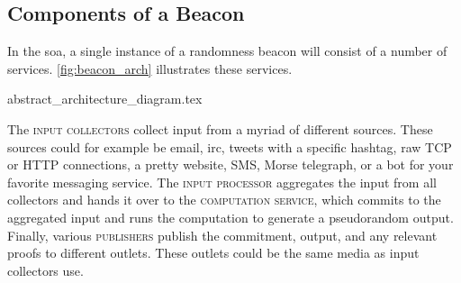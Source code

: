 \subsection{Components of a Beacon}%
\label{sub:components_of_a_beacon}

In the \gls{soa}, a single instance of a randomness beacon will consist of a number of services. \cref{fig:beacon_arch} illustrates these services.

{abstract_architecture_diagram.tex}

The \textsc{input collectors} collect input from a myriad of different sources. These sources could for example be email, irc, tweets with a specific hashtag, raw TCP or HTTP connections, a pretty website, SMS, Morse telegraph, or a bot for your favorite messaging service.
The \textsc{input processor} aggregates the input from all collectors and hands it over to the \textsc{computation service}, which commits to the aggregated input and runs the computation to generate a pseudorandom output.
Finally, various \textsc{publishers} publish the commitment, output, and any relevant proofs to different outlets. These outlets could be the same media as input collectors use.
